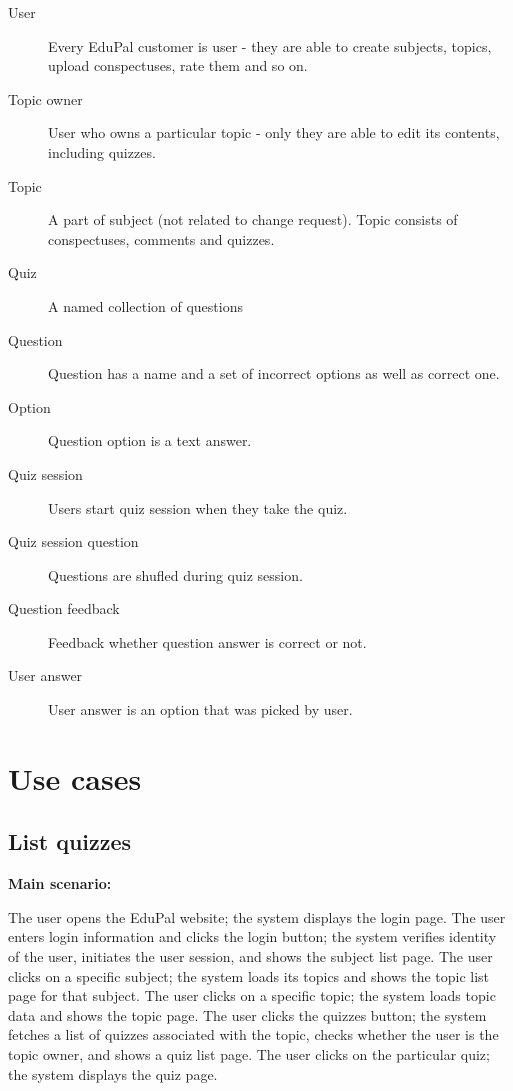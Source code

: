 \documentclass[
    english, %
]{VUMIFPSkursinis}
\begin{document}
\begin{description}
    \item[User] Every EduPal customer is user - they are able to create subjects, topics, upload conspectuses, rate them and so on.
    \item[Topic owner] User who owns a particular topic - only they are able to edit its contents, including quizzes.
    \item[Topic] A part of subject (not related to change request). Topic consists of conspectuses, comments and quizzes.
    \item[Quiz] A named collection of questions
    \item[Question] Question has a name and a set of incorrect options as well as correct one.
    \item[Option] Question option is a text answer.
    \item[Quiz session] Users start quiz session when they take the quiz.
    \item[Quiz session question] Questions are shufled during quiz session.
    \item[Question feedback] Feedback whether question answer is correct or not.
    \item[User answer] User answer is an option that was picked by user.
\end{description}

\section{Use cases}

\subsection{List quizzes}

\noindent\textbf{\fontsize{13}{15}\selectfont Main scenario:}

The user opens the EduPal website; the system displays the login page. The user enters login information and clicks the login button; the system verifies identity of the user, initiates the user session, and shows the subject list page. The user clicks on a specific subject; the system loads its topics and shows the topic list page for that subject. The user clicks on a specific topic; the system loads topic data and shows the topic page. The user clicks the quizzes button; the system fetches a list of quizzes associated with the topic, checks whether the user is the topic owner, and shows a quiz list page. The user clicks on the particular quiz; the system displays the quiz page.
\end{document}
